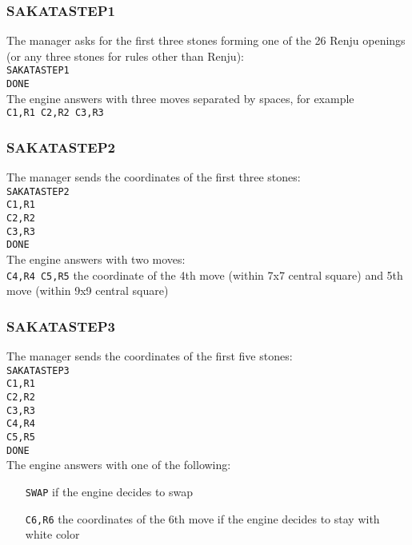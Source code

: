 \documentclass[12pt,a4paper]{article}
\begin{document}
\subsubsection{SAKATASTEP1}
The manager asks for the first three stones forming one of the 26 Renju openings (or any three stones for rules other than Renju):\\
\texttt{SAKATASTEP1}\\
\texttt{DONE}\\
The engine answers with three moves separated by spaces, for example\\
\texttt{C1,R1 C2,R2 C3,R3}

\subsubsection{SAKATASTEP2}
The manager sends the coordinates of the first three stones:\\
\texttt{SAKATASTEP2}\\
\texttt{C1,R1}\\
\texttt{C2,R2}\\
\texttt{C3,R3}\\
\texttt{DONE}\\
The engine answers with two moves:\\
\texttt{C4,R4 C5,R5} the coordinate of the 4th move (within 7x7 central square) and 5th move (within 9x9 central square)

\subsubsection{SAKATASTEP3}
The manager sends the coordinates of the first five stones:\\
\texttt{SAKATASTEP3}\\
\texttt{C1,R1}\\
\texttt{C2,R2}\\
\texttt{C3,R3}\\
\texttt{C4,R4}\\
\texttt{C5,R5}\\
\texttt{DONE}\\
The engine answers with one of the following:
\begin{enumerate}[leftmargin=7.5em]
\item[\texttt{SWAP}]{if the engine decides to swap}
\item[\texttt{C6,R6}]{the coordinates of the 6th move if the engine decides to stay with white color}
\end{enumerate}
\end{document}
